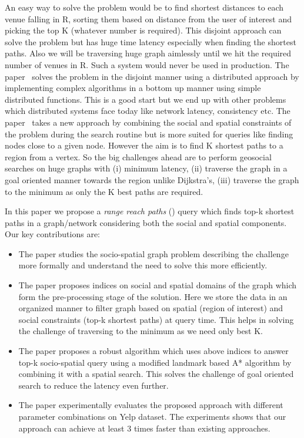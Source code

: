 An easy way to solve the problem would be to find shortest distances to each venue falling in R, sorting them based on distance from the user of interest and picking the top K (whatever number is required). This disjoint approach can solve the problem but has huge time latency especially when finding the shortest paths. Also we will be traversing huge graph aimlessly until we hit the required number of venues in R. Such a system would never be used in production. The paper~\cite{NSD2013} solves the problem in the disjoint manner using a distributed approach by implementing complex algorithms in a bottom up manner using simple distributed functions. This is a good start but we end up with other problems which distributed systems face today like network latency, consistency etc. The paper~\cite{KJY+2015} takes a new approach by combining the social and spatial constraints of the problem during the search routine but is more suited for queries like finding nodes close to a given node. However the aim is to find K shortest paths to a region from a vertex. So the big challenges ahead are to perform geosocial searches on huge graphs with (i) minimum latency, (ii) traverse the graph in a goal oriented manner towards the region unlike Dijkstra's, (iii) traverse the graph to the minimum as only the K best paths are required.

In this paper we propose a \textit{range reach paths} ({\rrp}) query which finds top-k shortest paths in a graph/network considering both the social and spatial components. Our key contributions are:
\begin{itemize}
	\item The paper studies the socio-spatial graph problem describing the challenge more formally and understand the need to solve this more efficiently.
	\item The paper proposes indices on social and spatial domains of the graph which form the pre-processing stage of the solution. Here we store the data in an organized manner to filter graph based on spatial (region of interest) and social constraints (top-k shortest paths) at query time. This helps in solving the challenge of traversing to the minimum as we need only best K.
	\item The paper proposes a robust algorithm which uses above indices to answer top-k socio-spatial query using a modified landmark based A* algorithm by combining it with a spatial search. This solves the challenge of goal oriented search to reduce the latency even further.
	\item The paper experimentally evaluates the proposed approach with different parameter combinations on Yelp dataset. The experiments shows that our approach can achieve at least 3 times faster than existing approaches.
\end{itemize}

